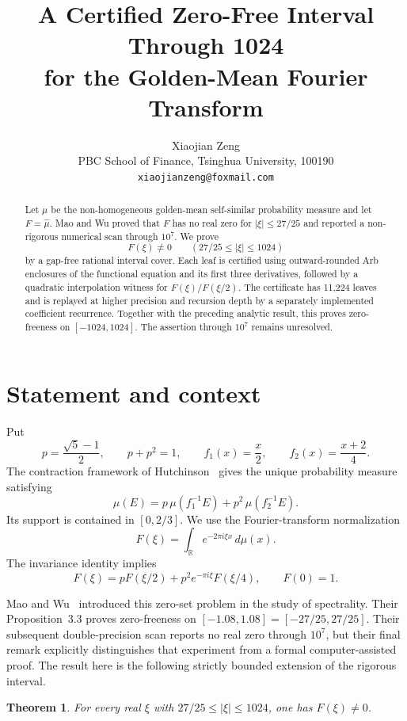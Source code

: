 \documentclass[11pt]{article}
\title{A Certified Zero-Free Interval Through 1024\\
for the Golden-Mean Fourier Transform}
\author{Xiaojian Zeng\\
PBC School of Finance, Tsinghua University, 100190\\
\texttt{xiaojianzeng@foxmail.com}}
\date{}
\newtheorem{theorem}{Theorem}
\newcommand{\R}{\mathbb R}
\begin{document}
\maketitle

\begin{abstract}
Let $\mu$ be the non-homogeneous golden-mean self-similar probability
measure and let $F=\widehat\mu$.  Mao and Wu proved that $F$ has no real
zero for $|\xi|\leq 27/25$ and reported a non-rigorous numerical scan through
$10^7$.  We prove
\[
        F(\xi)\ne0 \qquad (27/25\leq |\xi|\leq1024)
\]
by a gap-free rational interval cover.  Each leaf is certified using
outward-rounded Arb enclosures of the functional equation and its first
three derivatives, followed by a quadratic interpolation witness for
$F(\xi)/F(\xi/2)$.  The certificate has 11,224 leaves and is replayed at
higher precision and recursion depth by a separately implemented coefficient
recurrence.  Together with the preceding analytic result, this proves
zero-freeness on $[-1024,1024]$.  The assertion through $10^7$ remains
unresolved.
\end{abstract}

\section{Statement and context}

Put
\[
 p=\frac{\sqrt5-1}{2},\qquad p+p^2=1,
 \qquad f_1(x)=\frac{x}{2},\qquad f_2(x)=\frac{x+2}{4}.
\]
The contraction framework of Hutchinson~\cite{Hutchinson1981} gives the
unique probability measure satisfying
\[
 \mu(E)=p\,\mu(f_1^{-1}E)+p^2\,\mu(f_2^{-1}E).
\]
Its support is contained in $[0,2/3]$.  We use the Fourier-transform
normalization
\[
 F(\xi)=\int_{\R}e^{-2\pi i\xi x}\,d\mu(x).
\]
The invariance identity implies
\begin{equation}\label{eq:functional}
 F(\xi)=pF(\xi/2)+p^2e^{-\pi i\xi}F(\xi/4),
 \qquad F(0)=1.
\end{equation}

Mao and Wu~\cite{MaoWu2026} introduced this zero-set problem in the study of
spectrality.  Their Proposition~3.3 proves zero-freeness on
$[-1.08,1.08]=[-27/25,27/25]$.  Their subsequent double-precision scan reports
no real zero through $10^7$, but their final remark explicitly distinguishes
that experiment from a formal computer-assisted proof.  The result here is
the following strictly bounded extension of the rigorous interval.

\begin{theorem}\label{thm:main}
For every real $\xi$ with $27/25\leq |\xi|\leq1024$, one has
$F(\xi)\ne0$.
\end{theorem}
\end{document}
